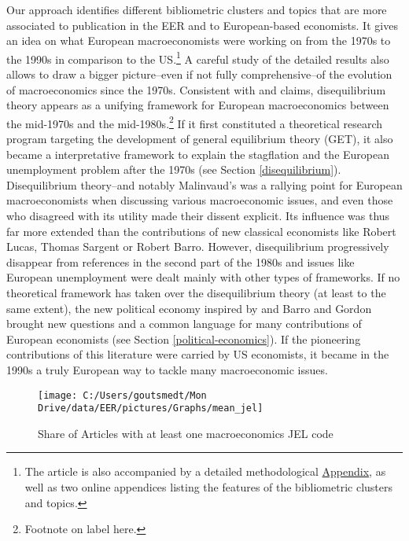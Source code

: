 \documentclass[]{elsarticle} %
\begin{document}
Our approach identifies different bibliometric clusters and topics that
are more associated to publication in the EER and to European-based
economists. It gives an idea on what European macroeconomists were
working on from the 1970s to the 1990s in comparison to the
US.\footnote{The article is also accompanied by a detailed
  methodological \protect\hyperlink{appendix}{Appendix}, as well as two
  online appendices listing the features of the bibliometric clusters
  and topics.} A careful study of the detailed results also allows to
draw a bigger picture--even if not fully comprehensive--of the evolution
of macroeconomics since the 1970s. Consistent with \citet{portes1987}
and \citet{goutsmedt2021} claims, disequilibrium theory appears as a
unifying framework for European macroeconomics between the mid-1970s and
the mid-1980s.\footnote{Footnote on label here.} If it first constituted
a theoretical research program targeting the development of general
equilibrium theory (GET), it also became a interpretative framework to
explain the stagflation and the European unemployment problem after the
1970s (see Section \ref{disequilibrium}). Disequilibrium theory--and
notably Malinvaud's \citeyearpar{malinvaud1977} was a rallying point for
European macroeconomists when discussing various macroeconomic issues,
and even those who disagreed with its utility made their dissent
explicit. Its influence was thus far more extended than the
contributions of new classical economists like Robert Lucas, Thomas
Sargent or Robert Barro. However, disequilibrium progressively disappear
from references in the second part of the 1980s and issues like European
unemployment were dealt mainly with other types of frameworks. If no
theoretical framework has taken over the disequilibrium theory (at least
to the same extent), the new political economy inspired by
\citet{kydland1977} and Barro and Gordon \citep{barro1983, barro1983c}
brought new questions and a common language for many contributions of
European economists (see Section \ref{political-economics}). If the
pioneering contributions of this literature were carried by US
economists, it became in the 1990s a truly European way to tackle many
macroeconomic issues.

\begin{figure}[h]

{\centering \texttt{[image: C:/Users/goutsmedt/Mon Drive/data/EER/pictures/Graphs/mean\_jel]} 

}

\caption{Share of Articles with at least one macroeconomics JEL code}\label{fig:plot-jel}
\end{figure}
\end{document}
